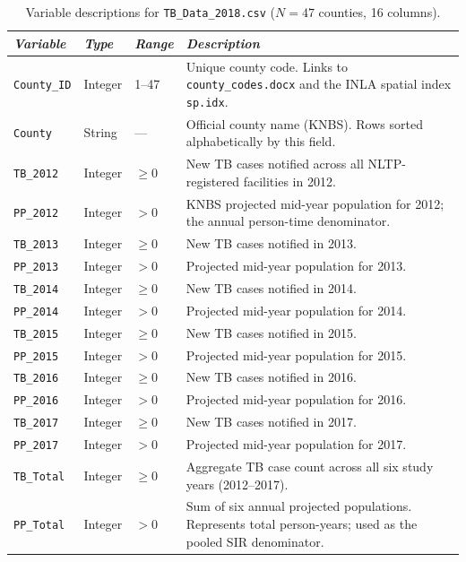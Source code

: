 \documentclass[11pt,a4paper]{article}
\newcommand{\code}[1]{\texttt{\small #1}}
\begin{document}
\begin{table}[H]
\caption{Variable descriptions for \texttt{TB\_Data\_2018.csv} ($N=47$ counties, 16 columns).}
\renewcommand{\arraystretch}{1.10}
\scriptsize\begin{tabularx}{\textwidth}{@{}L{2.7cm}L{1.4cm}L{1.6cm}X@{}}
\toprule
\textit{Variable} & \textit{Type} & \textit{Range} & \textit{Description}\\
\midrule
\code{County\_ID} & Integer & 1--47    & Unique county code. Links to \code{county\_codes.docx} and the INLA spatial index \code{sp.idx}.\\
\code{County}     & String  & ---      & Official county name (KNBS). Rows sorted alphabetically by this field.\\
\code{TB\_2012}   & Integer & $\geq 0$ & New TB cases notified across all NLTP-registered facilities in 2012.\\
\code{PP\_2012}   & Integer & $> 0$    & KNBS projected mid-year population for 2012; the annual person-time denominator.\\
\code{TB\_2013}   & Integer & $\geq 0$ & New TB cases notified in 2013.\\
\code{PP\_2013}   & Integer & $> 0$    & Projected mid-year population for 2013.\\
\code{TB\_2014}   & Integer & $\geq 0$ & New TB cases notified in 2014.\\
\code{PP\_2014}   & Integer & $> 0$    & Projected mid-year population for 2014.\\
\code{TB\_2015}   & Integer & $\geq 0$ & New TB cases notified in 2015.\\
\code{PP\_2015}   & Integer & $> 0$    & Projected mid-year population for 2015.\\
\code{TB\_2016}   & Integer & $\geq 0$ & New TB cases notified in 2016.\\
\code{PP\_2016}   & Integer & $> 0$    & Projected mid-year population for 2016.\\
\code{TB\_2017}   & Integer & $\geq 0$ & New TB cases notified in 2017.\\
\code{PP\_2017}   & Integer & $> 0$    & Projected mid-year population for 2017.\\
\code{TB\_Total}  & Integer & $\geq 0$ & Aggregate TB case count across all six study years (2012--2017).\\
\code{PP\_Total}  & Integer & $> 0$    & Sum of six annual projected populations. Represents total person-years; used as the pooled SIR denominator.\\
\bottomrule
\end{tabularx}
\renewcommand{\arraystretch}{1.10}
\end{table}
\end{document}
